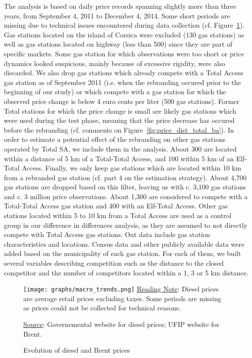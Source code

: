 \documentclass[english]{article}
\begin{document}
The analysis is based on daily price records spanning slightly more than three years, from September 4, 2011 to December 4, 2014. Some short periods are missing due to technical issues encountered during data collection (cf. Figure~\ref{fig:diesel_and_brent}). Gas stations located on the island of Corsica were excluded (130 gas stations) as well as gas stations located on highway (less than 500) since they are part of specific markets. Some gas station for which observations were too short or price dynamics looked suspicious, mainly because of excessive rigidity, were also discarded. We also drop gas stations which already compete with a Total Access gas station as of September 2011 (i.e. when the rebranding occured prior to the beginning of our study) or which compete with a gas station for which the observed price change is below 4 euro cents per liter (500 gas stations). Former Total stations for which the price change is small are likely gas stations which were used during the test phase, meaning that the price decrease has occured before the rebranding (cf. comments on Figure~\ref{fig:price_dist_total_ba}). In order to estimate a potential effect of the rebranding on other gas stations operated by Total SA, we include them in the analysis. About 300 are located within a distance of 5 km of a Total-Total Access, and 100 within 5 km of an Elf-Total Access. Finally, we only keep gas stations which are located within 10 km from a rebranded gas station (cf. part 4 on the estimation strategy). About 4,700 gas stations are dropped based on this filter, leaving us with c. 3,100 gas stations and c. 3 million price observations. About 1,300 are considered to compete with a Total-Total Access gas station and 400 with an Elf-Total Access. Other gas stations located within 5 to 10 km from a Total Access are used as a control group in our difference in differences analysis, as they are assumed to not directly compete with Total Access gas stations. Out data include gas station characteristics and locations. Census data and other publicly available data were added based on the municipality of each gas station. For each of them, we built several variables describing competition such as the distance to the closed competitor and the number of competitors located within a 1, 3 or 5 km distance.
\medskip{}

\begin{figure}[H]
    \caption{Evolution of diesel and Brent prices}
		\label{fig:diesel_and_brent}
\texttt{[image: graphs/macro\_trends.png]}
\flushleft
{\small{}\uline{Reading Note}}{\small{}:  
Diesel prices are average retail prices excluding taxes. Some periods are missing as prices could not be collected for technical reasons.}{\small \par} 
{\small{}\uline{Source}}{\small{}: Governemental website for diesel prices; UFIP website for Brent.}\medskip{}
\end{figure}
\end{document}
